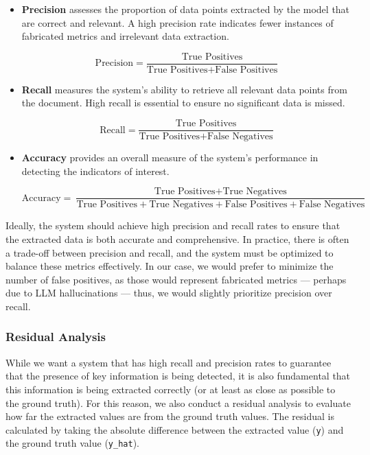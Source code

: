 \documentclass[english, 12pt, a4paper, elec, utf8, a-2b, online]{aaltothesis}
\begin{document}
\begin{itemize}
    \item \textbf{Precision} assesses the proportion of data points extracted by the model that are correct and relevant.
    A high precision rate indicates fewer instances of fabricated metrics and irrelevant data extraction.

    \begin{equation}
        \text{Precision} = \frac{\text{True Positives}}{\text{True Positives} + \text{False Positives}}
    \end{equation}

    \item \textbf{Recall} measures the system's ability to retrieve all relevant data points from the document.
    High recall is essential to ensure no significant data is missed.

    \begin{equation}
        \text{Recall} = \frac{\text{True Positives}}{\text{True Positives} + \text{False Negatives}}
    \end{equation}

    \item \textbf{Accuracy} provides an overall measure of the system's performance in detecting the indicators of interest.

    \begin{equation}
        \text{Accuracy} = \frac{\text{True Positives} + \text{True Negatives}}{\text{True Positives} + \text{True Negatives} + \text{False Positives} + \text{False Negatives}}
    \end{equation}
\end{itemize}

Ideally, the system should achieve high precision and recall rates to ensure that the extracted data is both accurate and comprehensive.
In practice, there is often a trade-off between precision and recall, and the system must be optimized to balance these metrics effectively.
In our case, we would prefer to minimize the number of false positives, as those would represent fabricated metrics --- perhaps due to \ac{LLM} hallucinations --- thus, we would slightly prioritize precision over recall.

\subsubsection{Residual Analysis}

While we want a system that has high recall and precision rates to guarantee that the presence of key information is being detected, it is also fundamental that this information is being extracted correctly (or at least as close as possible to the ground truth).
For this reason, we also conduct a residual analysis to evaluate how far the extracted values are from the ground truth values.
The residual is calculated by taking the absolute difference between the extracted value (\texttt{y}) and the ground truth value (\texttt{y\_hat}).
\end{document}
